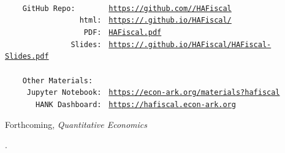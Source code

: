 \documentclass[\latexroot/HAFiscal]{subfiles}
\begin{document}
\providecommand{\REMARK}{\href{https://github.com/econ-ark/REMARK}{REMARK}}
\begin{footnotesize}
  \setlength{\parskip}{0pt}
  \parbox{0.9\textwidth}{
    \begin{tabbing}
      \texttt{~~~~~~~~~~~~~~~~~~~~~~~} \= \=  \\
      \texttt{~~~~GitHub~Repo:~~~~~~~} \> \> \texttt{\href{https://github.com/\owner/HAFiscal}{https://github.com/\owner/HAFiscal}} \\
      \texttt{~~~~~~~~~~~~~~~~~html:~} \> \> \texttt{\href{https://\owner.github.io/HAFiscal/}{https://\owner.github.io/HAFiscal/}} \\
      \texttt{~~~~~~~~~~~~~~~~~~PDF:~} \> \> \texttt{\href{https://github.com/\owner/HAFiscal/blob/master/HAFiscal.pdf}{HAFiscal.pdf}} \\
      \texttt{~~~~~~~~~~~~~~~Slides:~} \> \> \texttt{\href{https://\owner.github.io/HAFiscal/HAFiscal-Slides.pdf}{https://\owner.github.io/HAFiscal/HAFiscal-Slides.pdf}} \\
      \texttt{~~~~~~~~~~~~~~~~~~~~~~~} \> \>  \\
      \texttt{~~~~Other~Materials:~~~} \> \> \\
      \texttt{~~~~~Jupyter~Notebook:~} \> \> \texttt{\href{https://econ-ark.org/materials?hafiscal}{https://econ-ark.org/materials?hafiscal}} \\
      \texttt{~~~~~~~HANK~Dashboard:~} \> \> \texttt{\href{https://hafiscal.econ-ark.org}{https://hafiscal.econ-ark.org}} \\
    \end{tabbing}
  } %
\end{footnotesize}
\vspace{-0.3\baselineskip}

\centerline{Forthcoming, \textit{Quantitative Economics}}
\vspace{-0.3\baselineskip}

\begin{authorsinfo}
  \noindent {}. \newline
   \newline
   \newline
   \newline
\end{authorsinfo}
\end{document}
